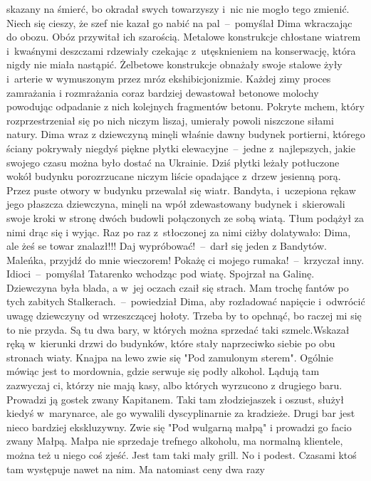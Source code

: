 \documentclass[../MAIN.tex]{subfiles}
\begin{document}
skazany na śmierć, bo okradał swych towarzyszy i~nic nie mogło tego zmienić.
\sd \xx
Niech się cieszy, że szef nie kazał go nabić na pal~--~pomyślał Dima wkraczając do obozu.
\qm
Obóz przywitał ich szarością. Metalowe konstrukcje chłostane wiatrem i~kwaśnymi
deszczami rdzewiały czekając z~utęsknieniem na konserwację, która nigdy nie
miała nastąpić. Żelbetowe konstrukcje obnażały swoje stalowe żyły i~arterie w
wymuszonym przez mróz ekshibicjonizmie. Każdej zimy proces zamrażania i
rozmrażania coraz bardziej dewastował betonowe molochy powodując odpadanie z
nich kolejnych fragmentów betonu. Pokryte mchem, który rozprzestrzeniał się po
nich niczym liszaj, umierały powoli niszczone siłami natury.
Dima wraz z
dziewczyną minęli właśnie dawny budynek portierni, którego ściany pokrywały
niegdyś piękne płytki elewacyjne~--~jedne z~najlepszych, jakie swojego czasu
można było dostać na Ukrainie. Dziś płytki leżały potłuczone wokół budynku
porozrzucane niczym liście opadające z~drzew jesienną porą. Przez puste otwory w
budynku przewalał się wiatr.
Bandyta, i~uczepiona rękaw jego płaszcza
dziewczyna, minęli na wpół zdewastowany budynek i~skierowali swoje kroki w
stronę dwóch budowli połączonych ze sobą wiatą. Tłum podążył za nimi drąc się i
wyjąc. Raz po raz z~stłoczonej za nimi ciżby dolatywało:
\sx Dima, ale żeś se towar znalazł!!! Daj wypróbować!~--~darł się jeden z
Bandytów.
\xx  Maleńka, przyjdź do mnie wieczorem! Pokażę ci mojego rumaka!~--~krzyczał
inny.
\qd
\sx  Idioci~--~pomyślał Tatarenko wchodząc pod wiatę. Spojrzał na Galinę. Dziewczyna była blada, a w~jej oczach czaił się strach.
\qd \sx  Mam trochę fantów po tych zabitych Stalkerach.~--~powiedział Dima, aby
rozładować napięcie i~odwrócić uwagę dziewczyny od wrzeszczącej hołoty. \x Trzeba by to opchnąć, bo raczej mi się to nie przyda. Są tu dwa bary, w
których
można sprzedać taki szmelc.\x Wskazał ręką w~kierunki drzwi do budynków, które
stały naprzeciwko siebie po obu stronach wiaty. Knajpa na lewo zwie się "Pod
zamulonym sterem". Ogólnie mówiąc jest to mordownia, gdzie serwuje się podły
alkohol. Lądują tam zazwyczaj ci, którzy nie mają kasy, albo których wyrzucono z
drugiego baru. Prowadzi ją gostek zwany Kapitanem. Taki tam złodziejaszek i
oszust, służył kiedyś w~marynarce, ale go wywalili dyscyplinarnie za kradzieże.
Drugi bar jest nieco bardziej ekskluzywny. Zwie się "Pod wulgarną małpą" i
prowadzi go facio zwany Małpą. Małpa nie sprzedaje trefnego alkoholu, ma
normalną klientele, można też u niego coś zjeść. Jest tam taki mały grill. No i
podest. Czasami ktoś tam występuje nawet na nim. Ma natomiast ceny dwa razy
\end{document}
